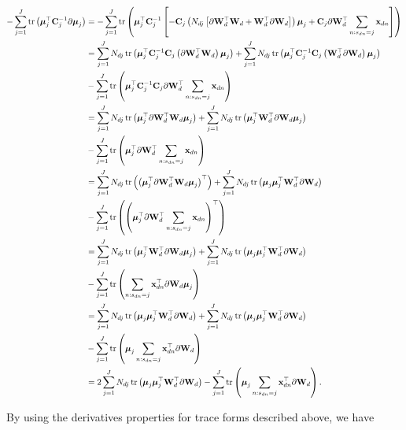 	\begin{align}
	-\sum_{j=1}^{J}\operatorname{tr}\left( \boldsymbol{\mu}_j^\top\mathbf{C}_j^{-1}\partial\boldsymbol{\mu}_j\right) &=-\sum_{j=1}^{J}\operatorname{tr}\left( \boldsymbol{\mu}_j^\top\mathbf{C}_j^{-1}\left[-\mathbf{C}_j\left(N_{dj}\left[\partial\mathbf{W}_d^\top\mathbf{W}_d+\mathbf{W}_d^\top\partial\mathbf{W}_d\right]\right)\boldsymbol{\mu}_j+\mathbf{C}_j\partial\mathbf{W}_d^\top\sum_{n:s_{dn}=j}\mathbf{x}_{dn}\right]\right) \notag \\
	&= \sum_{j=1}^{J}N_{dj}\operatorname{tr}\left(\boldsymbol{\mu}_j^\top\mathbf{C}_j^{-1}\mathbf{C}_j\left(\partial\mathbf{W}_d^\top\mathbf{W}_d\right)\boldsymbol{\mu}_j\right) +  \sum_{j=1}^{J}N_{dj}\operatorname{tr}\left(\boldsymbol{\mu}_j^\top\mathbf{C}_j^{-1}\mathbf{C}_j\left(\mathbf{W}_d^\top\partial\mathbf{W}_d\right)\boldsymbol{\mu}_j\right) \notag\\
	&-\sum_{j=1}^{J}\operatorname{tr}\left(\boldsymbol{\mu}_j^\top\mathbf{C}_j^{-1}\mathbf{C}_j\partial\mathbf{W}_d^\top\sum_{n:s_{dn}=j}\mathbf{x}_{dn}\right) \notag \\
	&= \sum_{j=1}^{J}N_{dj}\operatorname{tr}\left(\boldsymbol{\mu}_j^\top\partial\mathbf{W}_d^\top\mathbf{W}_d\boldsymbol{\mu}_j\right) +  \sum_{j=1}^{J}N_{dj}\operatorname{tr}\left(\boldsymbol{\mu}_j^\top\mathbf{W}_d^\top\partial\mathbf{W}_d\boldsymbol{\mu}_j\right) \notag\\
	&-\sum_{j=1}^{J}\operatorname{tr}\left(\boldsymbol{\mu}_j^\top\partial\mathbf{W}_d^\top\sum_{n:s_{dn}=j}\mathbf{x}_{dn}\right) \notag \\
	&= \sum_{j=1}^{J}N_{dj}\operatorname{tr}\left(\left(\boldsymbol{\mu}_j^\top\partial\mathbf{W}_d^\top\mathbf{W}_d\boldsymbol{\mu}_j\right)^\top\right) +  \sum_{j=1}^{J}N_{dj}\operatorname{tr}\left(\boldsymbol{\mu}_j\boldsymbol{\mu}_j^\top\mathbf{W}_d^\top\partial\mathbf{W}_d\right) \notag\\
	&-\sum_{j=1}^{J}\operatorname{tr}\left(\left(\boldsymbol{\mu}_j^\top\partial\mathbf{W}_d^\top\sum_{n:s_{dn}=j}\mathbf{x}_{dn}\right)^\top\right) \notag \\
	&= \sum_{j=1}^{J}N_{dj}\operatorname{tr}\left(\boldsymbol{\mu}_j^\top\mathbf{W}_d^\top\partial\mathbf{W}_d\boldsymbol{\mu}_j\right) +  \sum_{j=1}^{J}N_{dj}\operatorname{tr}\left(\boldsymbol{\mu}_j\boldsymbol{\mu}_j^\top\mathbf{W}_d^\top\partial\mathbf{W}_d\right) \notag\\
	&-\sum_{j=1}^{J}\operatorname{tr}\left(\sum_{n:s_{dn}=j}\mathbf{x}_{dn}^\top\partial\mathbf{W}_d\boldsymbol{\mu}_j\right) \notag \\
	&= \sum_{j=1}^{J}N_{dj}\operatorname{tr}\left(\boldsymbol{\mu}_j\boldsymbol{\mu}_j^\top\mathbf{W}_d^\top\partial\mathbf{W}_d\right) +  \sum_{j=1}^{J}N_{dj}\operatorname{tr}\left(\boldsymbol{\mu}_j\boldsymbol{\mu}_j^\top\mathbf{W}_d^\top\partial\mathbf{W}_d\right) \notag\\
	&-\sum_{j=1}^{J}\operatorname{tr}\left(\boldsymbol{\mu}_j\sum_{n:s_{dn}=j}\mathbf{x}_{dn}^\top\partial\mathbf{W}_d\right) \notag \\
	&= 2\sum_{j=1}^{J}N_{dj}\operatorname{tr}\left(\boldsymbol{\mu}_j\boldsymbol{\mu}_j^\top\mathbf{W}_d^\top\partial\mathbf{W}_d\right)-\sum_{j=1}^{J}\operatorname{tr}\left(\boldsymbol{\mu}_j\sum_{n:s_{dn}=j}\mathbf{x}_{dn}^\top\partial\mathbf{W}_d\right) .
	\end{align}
	
	
	By using the derivatives properties for trace forms described above, we have
	
